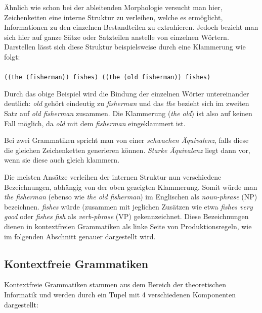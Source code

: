 \documentclass[12pt]{report}
\begin{document}
Ähnlich wie schon bei der ableitenden Morphologie versucht man hier, Zeichenketten eine interne Struktur zu verleihen, welche es ermöglicht, Informationen zu den einzelnen Bestandteilen zu extrahieren. Jedoch bezieht man sich hier auf ganze Sätze oder Satzteilen anstelle von einzelnen Wörtern. Darstellen lässt sich diese Struktur beispielsweise durch eine Klammerung wie folgt:\\
\tt
\\((the (fisherman)) fishes)
((the (old fisherman)) fishes)
\\ \rm

Durch das obige Beispiel wird die Bindung der einzelnen Wörter untereinander deutlich: \textit{\glqq  old\grqq{}} gehört eindeutig zu \textit{\glqq  fisherman\grqq{}} und das \textit{\glqq  the\grqq{}} bezieht sich im zweiten Satz auf \textit{\glqq  old fisherman\grqq{}} zusammen. Die Klammerung (\textit{the old}) ist also auf keinen Fall möglich, da \textit{\glqq  old\grqq{}} mit dem \textit{\glqq  fisherman\grqq{}} eingeklammert ist. 

Bei zwei Grammatiken spricht man von einer \textit{schwachen Äquivalenz}, falls diese die gleichen Zeichenketten generieren können. \textit{Starke Äquivalenz} liegt dann vor, wenn sie diese auch gleich klammern. 

Die meisten Ansätze verleihen der internen Struktur nun verschiedene Bezeichnungen, abhängig von der oben gezeigten Klammerung. Somit würde man \textit{\glqq  the fisherman\grqq{}} (ebenso wie \textit{\glqq  the old fisherman\grqq{}}) im Englischen als \textit{\glqq  noun-phrase\grqq{}} (NP) bezeichnen. \textit{\glqq  fishes\grqq{}} würde (zusammen mit jeglichen Zusätzen wie etwa \textit{\glqq  fishes very good\grqq{}} oder \textit{\glqq  fishes fish\grqq{}} als \textit{\glqq  verb-phrase\grqq{}} (VP) gekennzeichnet. Diese Bezeichnungen dienen in kontextfreien Grammatiken als linke Seite von Produktionsregeln, wie im folgenden Abschnitt genauer dargestellt wird.

\subsection{Kontextfreie Grammatiken}
Kontextfreie Grammatiken stammen aus dem Bereich der theoretischen Informatik \cite{bw84} und werden durch ein Tupel mit 4 verschiedenen Komponenten dargestellt:
\end{document}
